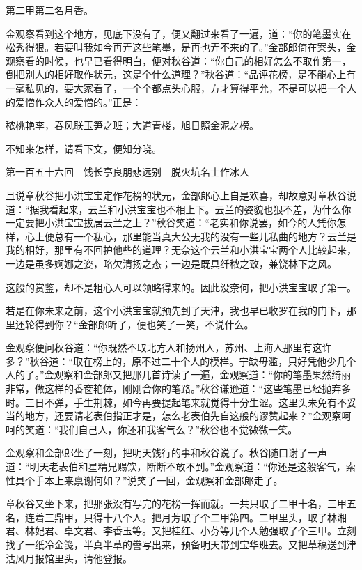\documentclass[12pt,UTF8]{ctexbook}
\begin{document}
{{{第二甲第二名月香。

金观察看到这个地方，见底下没有了，便又翻过来看了一遍，道：“你的笔墨实在松秀得狠。若要叫我如今再弄这些笔墨，是再也弄不来的了。”金部郎倚在案头，金观察看的时候，也早已看得明白，便对秋谷道：“你自己的相好怎么不取作第一，倒把别人的相好取作状元，这是个什么道理？”秋谷道：“品评花榜，是不能心上有一毫私见的，要大家看了，一个个都点头心服，方才算得平允，不是可以把一个人的爱憎作众人的爱憎的。”正是：

秾桃艳李，春风联玉笋之班；大道青楼，旭日照金泥之榜。

不知来怎样，请看下文，便知分晓。





第一百五十六回　饯长亭良朋悲远别　脱火坑名士作冰人





且说章秋谷把小洪宝宝定作花榜的状元，金部郎心上自是欢喜，却故意对章秋谷说道：“据我看起来，云兰和小洪宝宝也不相上下。云兰的姿貌也狠不差，为什么你一定要把小洪宝宝拔居云兰之上？”秋谷笑道：“老实和你说罢，如今的人凭你怎样，心上便总有一个私心，那里能当真大公无我的没有一些儿私曲的地方？云兰是我的相好，那里有不回护他些的道理？无奈这个云兰和小洪宝宝两个人比较起来，一边是虽多婀娜之姿，略欠清扬之态；一边是既具纤秾之致，兼饶林下之风。

这般的赏鉴，却不是粗心人可以领略得来的。因此没奈何，把小洪宝宝取了第一。

若是在你未来之前，这个小洪宝宝就预先到了天津，我也早已收罗在我的门下，那里还轮得到你？“金部郎听了，便也笑了一笑，不说什么。

金观察便问秋谷道：“你既然不取北方人和扬州人，苏州、上海人那里有这许多？”秋谷道：“取在榜上的，原不过二十个人的模样。宁缺毋滥，只好凭他少几个人的了。”金观察和金部郎又把那几首诗读了一遍，金观察道：“你的笔墨果然绮丽非常，做这样的香奁艳体，刚刚合你的笔路。”秋谷谦逊道：“这些笔墨已经抛弃多时。三日不弹，手生荆棘，如今再要提起笔来就觉得十分生涩。这里头未免有不妥当的地方，还要请老表伯指正才是，怎么老表伯先自这般的谬赞起来？”金观察呵呵的笑道：“我们自己人，你还和我客气么？”秋谷也不觉微微一笑。

金观察和金部郎坐了一刻，把明天饯行的事和秋谷说了。秋谷随口谢了一声道：“明天老表伯和星精兄赐饮，断断不敢不到。”金观察道：“你还是这般客气，索性具个手本上来禀谢何如？”说笑了一回，金观察和金部郎走了。

章秋谷又坐下来，把那张没有写完的花榜一挥而就。一共只取了二甲十名，三甲五名，连着三鼎甲，只得十八个人。把月芳取了个二甲第四。二甲里头，取了林湘君、林妃君、卓文君、李香玉等。又把桂红、小芬等几个人勉强取了个三甲。立刻找了一纸冷金笺，半真半草的誊写出来，预备明天带到宝华班去。又把草稿送到津沽风月报馆里头，请他登报。

}}}
\end{document}
